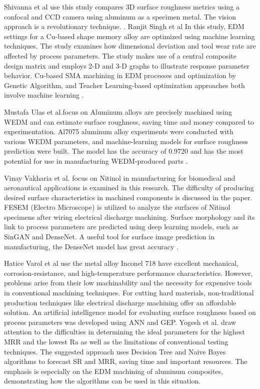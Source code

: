 \documentclass[suppldata]{interact}
\begin{document}
 Shivanna et al use this study compares 3D surface roughness metrics using a confocal and CCD camera using aluminum as a specimen metal. The vision approach is a revolutionary technique.
\textbf{\cite{shivanna2014evaluation}}.
 Ranjit Singh et al In this study, EDM settings for a Cu-based shape memory alloy are optimized using machine learning techniques. The study examines how dimensional deviation and tool wear rate are affected by process parameters. The study makes use of a central composite design matrix and employs 2-D and 3-D graphs to illustrate response parameter behavior. Cu-based SMA machining in EDM processes and optimization by Genetic Algorithm, and Teacher Learning-based optimization approaches both involve machine learning \textbf{\cite{singh2022machine}}.

 Mustafa Ulas et al.focus on Aluminum alloys are precisely machined using WEDM and can estimate surface roughness, saving time and money compared to experimentation. Al7075 aluminum alloy experiments were conducted with various WEDM parameters, and machine-learning models for surface roughness prediction were built. The model has the accuracy of 0.9720 and has the most potential for use in manufacturing WEDM-produced parts \textbf{\cite{ulas2020surface}} .

 Vinay Vakharia et al. focus on Nitinol in manufacturing for biomedical and aeronautical applications is examined in this research. The difficulty of producing desired surface characteristics in machined components is discussed in the paper. FESEM (Electro Microscope) is utilized to analyze the surfaces of Nitinol specimens after wiring electrical discharge machining. Surface morphology and its link to process parameters are predicted using deep learning models, such as SinGAN and DenseNet. A useful tool for surface image prediction in manufacturing, the DenseNet model has great accuracy \textbf{\cite{vakharia2022experimental}}.

 Hatice Varol et al use the metal alloy Inconel 718 have excellent mechanical, corrosion-resistance, and high-temperature performance characteristics. However, problems arise from their low machinability and the necessity for expensive tools in conventional machining techniques. For cutting hard materials, non-traditional production techniques like electrical discharge machining offer an affordable solution. An artificial intelligence model for evaluating surface roughness based on process parameters was developed using ANN and GEP\textbf{\cite{varol2021estimating}}.
 Yogesh et al. draw attention to the difficulties in determining the ideal parameters for the highest MRR and the lowest Ra as well as the limitations of conventional testing techniques. The suggested approach uses Decision Tree and Naive Bayes algorithms to forecast SR and MRR, saving time and important resources. The emphasis is especially on the EDM machining of aluminum composites, demonstrating how the algorithms can be used in this situation\textbf{\cite{yogesh2021predicton}}.
\end{document}
